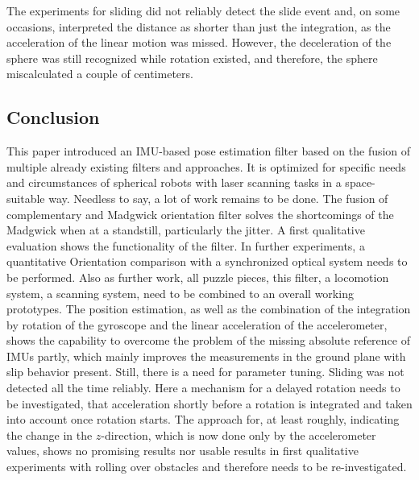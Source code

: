\documentclass[letterpaper, 10 pt, conference]{ieeeconf}  %
\begin{document}
The experiments for sliding did not reliably detect the slide event and, on some occasions, interpreted the distance as shorter than just the integration, as the acceleration of the linear motion was missed.
However, the deceleration of the sphere was still recognized while rotation existed, and therefore, the sphere miscalculated a couple of centimeters.


\subsection{Conclusion}
This paper introduced an IMU-based pose estimation filter based on the fusion of multiple already existing filters and approaches.
It is optimized for specific needs and circumstances of spherical robots with laser scanning tasks in a space-suitable way.
Needless to say, a lot of work remains to be done.
The fusion of complementary and Madgwick orientation filter solves the shortcomings of the Madgwick when at a standstill, particularly the jitter.
A first qualitative evaluation shows the functionality of the filter.
In further experiments, a quantitative Orientation comparison with a synchronized optical system needs to be performed.
Also as further work, all puzzle pieces, this filter, a locomotion system, a scanning system,  need to be combined to an overall working prototypes.
The position estimation, as well as the combination of the integration by rotation of the gyroscope and the linear acceleration of the accelerometer, shows the capability to overcome the problem of the missing absolute reference of IMUs partly, which mainly improves the measurements in the ground plane with slip behavior present.
Still, there is a need for parameter tuning. 
Sliding was not detected all the time reliably.
Here a mechanism for a delayed rotation needs to be investigated, that acceleration shortly before a rotation is integrated and taken into account once rotation starts.
The approach for, at least roughly, indicating the change in the $z$-direction, which is now done only by the accelerometer values, shows no promising results nor usable results in first qualitative experiments with rolling over obstacles and therefore needs to be re-investigated.




\addtolength{\textheight}{-12cm}   %
\end{document}
